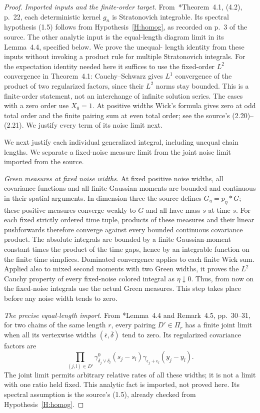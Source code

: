 \documentclass[12pt]{article}
\numberwithin{equation}{section}
\theoremstyle{definition}
\begin{document}
\begin{proof}
  \emph{Imported inputs and the finite-order target.}
  From~\cite{chen:author2026:time-dependency}*{Theorem~4.1, (4.2), p.~22}, each
  deterministic kernel $g_n$ is Stratonovich integrable. Its spectral
  hypothesis (1.5) follows from Hypothesis~\ref{H:homog}, as recorded
  on p.~3 of the source. The other analytic input is the equal-length
  diagram limit in its Lemma~4.4, specified below. We prove the unequal-
  length identity from these inputs without invoking a product rule for
  multiple Stratonovich integrals.
  For the expectation identity needed here it suffices to use the fixed-order
  $L^2$ convergence in Theorem~4.1: Cauchy--Schwarz gives $L^1$ convergence
  of the product of two regularized factors, since their $L^2$ norms stay
  bounded. This is a finite-order statement, not an interchange of infinite
  solution series. The cases with a zero order use $X_0=1$.
  At positive widths Wick's formula gives zero at odd total order and
  the finite pairing sum at even total order; see the source's
  (2.20)--(2.21). We justify every term of its noise limit next.

  We next justify each individual generalized integral, including unequal
  chain lengths. We separate a fixed-noise measure limit from the joint
  noise limit imported from the source.

  \emph{Green measures at fixed noise widths.}
  At fixed positive noise widths, all covariance functions and all finite
  Gaussian moments are bounded and continuous in their spatial arguments.
  In dimension three the source defines $G_\eta=p_\eta*G$; these positive
  measures converge weakly to $G$ and all have mass $s$ at time $s$.
  For each fixed strictly ordered time tuple, products of these measures
  and their linear pushforwards therefore converge against every bounded
  continuous covariance product. The absolute integrals are bounded by
  a finite Gaussian-moment constant times the product of the time gaps,
  hence by an integrable function on the finite time simplices. Dominated
  convergence applies to each finite Wick sum. Applied also to mixed
  second moments with two Green widths, it proves the $L^2$ Cauchy
  property of every fixed-noise colored integral as $\eta\downarrow0$.
  Thus, from now on the fixed-noise integrals use the actual Green
  measures. This step takes place before any noise width tends to zero.

  \emph{The precise equal-length import.}
  From
  \cite{chen:author2026:time-dependency}*{Lemma~4.4 and Remark~4.5,
  pp.~30--31}, for two chains of the same length $r$, every pairing
  $D'\in\Pi_r$ has a finite joint limit when all its vertexwise widths
  $(\bar\epsilon,\bar\delta)$ tend to zero. Its regularized covariance
  factors are
  \[
    \prod_{(j,l)\in D'}
    \gamma^0_{\delta_j\vee\delta_l}(s_j-s_l)
    \gamma_{\epsilon_j+\epsilon_l}(y_j-y_l).
  \]
  The joint limit permits arbitrary relative rates of all these widths;
  it is not a limit with one ratio held fixed. This analytic fact is
  imported, not proved here. Its spectral assumption is the source's
  (1.5), already checked from Hypothesis~\ref{H:homog}.


\end{proof}
\end{document}
